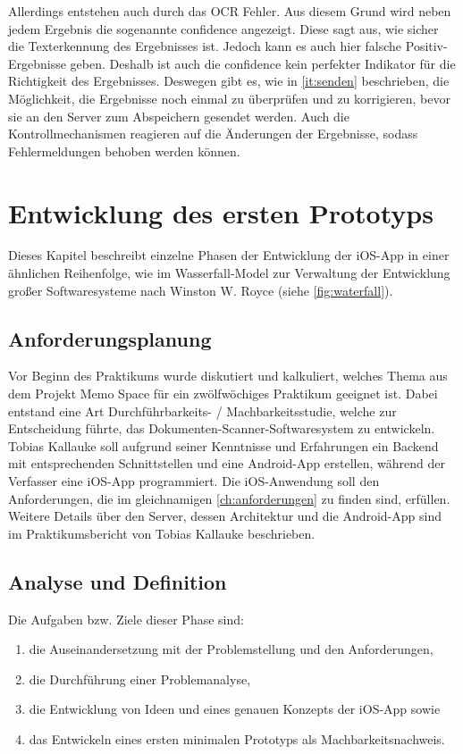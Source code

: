 \documentclass[notables, nomenclature, oneside, 150]{HSMW-Thesis}
\begin{document}
		Allerdings entstehen auch durch das OCR Fehler. Aus diesem Grund wird neben jedem Ergebnis die sogenannte confidence angezeigt. Diese sagt aus, wie sicher die Texterkennung des Ergebnisses ist. Jedoch kann es auch hier falsche Positiv-Ergebnisse geben. Deshalb ist auch die confidence kein perfekter Indikator für die Richtigkeit des Ergebnisses. Deswegen gibt es, wie in \autoref{it:senden} beschrieben, die Möglichkeit, die Ergebnisse noch einmal zu überprüfen und zu korrigieren, bevor sie an den Server zum Abspeichern gesendet werden. Auch die Kontrollmechanismen reagieren auf die Änderungen der Ergebnisse, sodass Fehlermeldungen behoben werden können.


\chapter{Entwicklung des ersten Prototyps}\label{ch:prototyp}
	Dieses Kapitel beschreibt einzelne Phasen der Entwicklung der iOS-App in einer ähnlichen Reihenfolge, wie im Wasserfall-Model zur Verwaltung der Entwicklung großer Softwaresysteme nach Winston W. Royce \cite{royce_managing_1970} (siehe \autoref{fig:waterfall}).
    	
	\section{Anforderungsplanung}\label{sc:anforderungsplanung}
	Vor Beginn des Praktikums wurde diskutiert und kalkuliert, welches Thema aus dem Projekt Memo Space für ein zwölfwöchiges Praktikum geeignet ist. Dabei entstand eine Art Durchführbarkeits- / Machbarkeitsstudie, welche zur Entscheidung führte, das Dokumenten-Scanner-Softwaresystem zu entwickeln. Tobias Kallauke soll aufgrund seiner Kenntnisse und Erfahrungen ein Backend mit entsprechenden Schnittstellen und eine Android-App erstellen, während der Verfasser eine iOS-App programmiert. Die iOS-Anwendung soll den Anforderungen, die im gleichnamigen \autoref{ch:anforderungen} zu finden sind, erfüllen. Weitere Details über den Server, dessen Architektur und die Android-App sind im Praktikumsbericht von Tobias Kallauke beschrieben.


\section{Analyse und Definition}\label{sc:analyse}
		Die Aufgaben bzw. Ziele dieser Phase sind: 
		\vspace{-5mm}
		\begin{enumerate}
			\item die Auseinandersetzung mit der Problemstellung und den Anforderungen,
			\item die Durchführung einer Problemanalyse,
			\item die Entwicklung von Ideen und eines genauen Konzepts der iOS-App sowie 
			\item das Entwickeln eines ersten minimalen Prototyps als Machbarkeitsnachweis.
		\end{enumerate}
\end{document}
